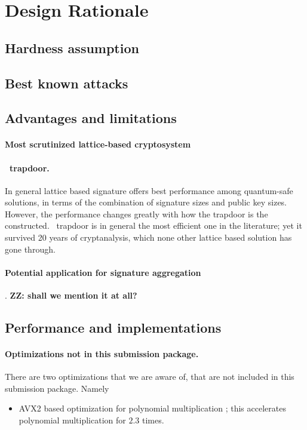\documentclass{llncs}
\newcommand{\ntru}{{\sf{NTRU}}}
\newcommand{\<}{\langle}
\renewcommand{\>}{\rangle}
\begin{document}
\section{Design Rationale}
\subsection{Hardness assumption}

\subsection{Best known attacks}\label{sec:known_attack_security}




\subsection{Advantages and limitations}
\paragraph{Most scrutinized lattice-based cryptosystem}


\paragraph{\ntru~trapdoor.}
In general lattice based signature offers best performance among quantum-safe solutions, in terms of the combination of signature 
sizes and public key sizes. However, the performance changes greatly 
with how the trapdoor is the constructed. \ntru~trapdoor is in 
general the most efficient one in the literature;  yet it survived
20 years of cryptanalysis, which none other lattice based solution 
has gone through.



\paragraph{Potential application for signature aggregation}. {\bf ZZ: shall we mention it at all?}
\subsection{Performance and implementations}

\paragraph{Optimizations not in this submission package.}
There are two optimizations that we are aware of, that are not 
included in this submission package. Namely
\begin{itemize}
\item AVX2 based optimization for polynomial multiplication \cite{ntrutoc}; this accelerates polynomial multiplication for $2.3$ times.
\end{itemize}
\end{document}
